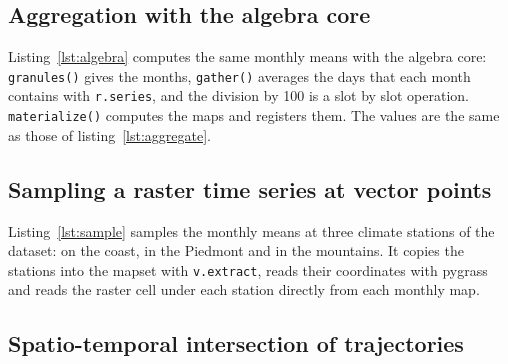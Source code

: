 \documentclass[10pt,a4paper]{article}
\makeatletter
\newcommand{\code}[1]{\texttt{#1}}
\newcommand{\attachmentdate}{D:20261106000000Z}
\DeclareRobustCommand{\examplefile}[1]{%
  \code{python/grass/docs/src/temporal\_framework\_design/examples/%
    \detokenize{#1}}\\
  attached to this PDF as \code{\detokenize{#1}}%
  \embedfileifobjectexists{\detokenize{#1}}{Filespec}{}{%
    \begingroup
    \def\pdf@filemoddate##1{\attachmentdate}%
    \embedfile[id=\detokenize{#1},filespec=\detokenize{#1},
      mimetype=text/x-python]{examples/\detokenize{#1}}%
    \endgroup}}
\makeatother
\begin{document}




\subsection{Aggregation with the algebra core}

Listing~\ref{lst:algebra} computes the same monthly means with the algebra
core: \code{granules()} gives the months, \code{gather()} averages the days
that each month contains with \code{r.series}, and the division by 100 is a
slot by slot operation. \code{materialize()} computes the maps and registers
them. The values are the same as those of listing~\ref{lst:aggregate}.





\subsection{Sampling a raster time series at vector points}

Listing~\ref{lst:sample} samples the monthly means at three climate stations of
the dataset: on the coast, in the Piedmont and in the mountains. It copies the
stations into the mapset with \code{v.extract}, reads their coordinates with
pygrass and reads the raster cell under each station directly from each
monthly map.





\subsection{Spatio-temporal intersection of trajectories}
\end{document}
